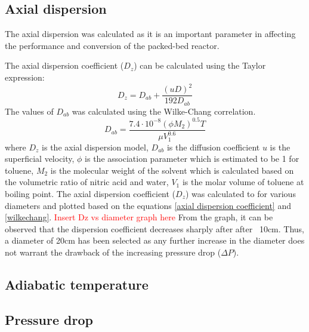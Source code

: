 \subsection{Axial dispersion}
The axial dispersion was calculated as it is an important parameter in affecting the performance and conversion of the packed-bed reactor. 

The axial dispersion coefficient ($D_z$) can be calculated using the Taylor expression: 
\begin{equation}
    D_z=D_{ab}+\frac{(uD)^2}{192D_{ab}}
    \label{axial dispersion coefficient}
\end{equation}
The values of $D_{ab}$ was calculated using the Wilke-Chang correlation.
\begin{equation}
    D_{ab}=\frac{7.4\cdot 10^{-8}(\phi M_2)^{0.5}T}{\mu V_1^{0.6}}
    \label{wilkechang}
\end{equation}
where $D_z$ is the axial dispersion model, $D_{ab}$ is the diffusion coefficient $u$ is the superficial velocity, $\phi$ is the association parameter which is estimated to be 1 for toluene, $M_2$ is the molecular weight of the solvent which is calculated based on the volumetric ratio of nitric acid and water, $V_1$ is the molar volume of toluene at boiling point.
The axial dispersion coefficient ($D_z$) was calculated to for various diameters and plotted based on the equations \ref{axial dispersion coefficient} and \ref{wilkechang}.
\textcolor{red}{Insert Dz vs diameter graph here} 
From the graph, it can be observed that the dispersion coefficient decreases sharply after after ~10cm. Thus, a diameter of 20cm has been selected as any further increase in the diameter does not warrant the drawback of the increasing pressure drop ($\Delta P$).
\subsection{Adiabatic temperature}
\subsection{Pressure drop}